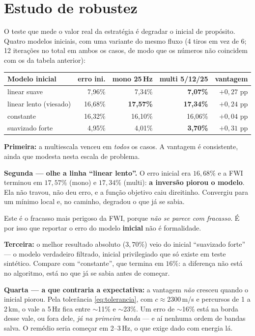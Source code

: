 \documentclass[11pt,a4paper,oneside]{report}
\begin{document}
\section{Estudo de robustez}

O teste que mede o valor real da estrat\'egia \'e degradar o inicial de
prop\'osito. Quatro modelos iniciais, com uma variante do mesmo fluxo (4 tiros
em vez de 6; 12 itera\c{c}\~oes no total em ambos os casos, de modo que os
n\'umeros n\~ao coincidem com os da tabela anterior):

\begin{center}
\begin{tabular}{@{}lrrrr@{}}
\toprule
\textbf{Modelo inicial} & \textbf{erro ini.} & \textbf{mono 25\,Hz}
& \textbf{multi 5/12/25} & \textbf{vantagem} \\
\midrule
linear suave           & 7{,}96\%  & 7{,}34\%  & \textbf{7{,}07\%}  & $+0{,}27$ pp \\
linear lento (viesado) & 16{,}68\% & \textbf{17{,}57\%} & \textbf{17{,}34\%} & $+0{,}24$ pp \\
constante              & 16{,}32\% & 16{,}10\% & 16{,}06\% & $+0{,}04$ pp \\
suavizado forte        & 4{,}95\%  & 4{,}01\%  & \textbf{3{,}70\%}  & $+0{,}31$ pp \\
\bottomrule
\end{tabular}
\end{center}

\begin{teoria}
\textbf{Primeira:} a multiescala venceu em \emph{todos} os casos. A vantagem
\'e consistente, ainda que modesta nesta escala de problema.

\textbf{Segunda --- olhe a linha ``linear lento''.} O erro inicial era
$16{,}68\%$ e a FWI terminou em $17{,}57\%$ (mono) e $17{,}34\%$ (multi):
\textbf{a invers\~ao piorou o modelo}. Ela n\~ao travou, n\~ao deu erro, e a
fun\c{c}\~ao objetivo caiu direitinho. Convergiu para um m\'inimo local e, no
caminho, degradou o que j\'a se sabia.

Este \'e o fracasso mais perigoso da FWI, porque \emph{n\~ao se parece com
fracasso}. \'E por isso que reportar o erro do modelo \textbf{inicial} n\~ao
\'e formalidade.

\textbf{Terceira:} o melhor resultado absoluto ($3{,}70\%$) veio do inicial
``suavizado forte'' --- o modelo verdadeiro filtrado, inicial privilegiado que
s\'o existe em teste sint\'etico. Compare com ``constante'', que termina em
$16\%$: a diferen\c{c}a n\~ao est\'a no algoritmo, est\'a no que j\'a se sabia
antes de come\c{c}ar.

\textbf{Quarta --- a que contraria a expectativa:} a vantagem \emph{n\~ao}
cresceu quando o inicial piorou. Pela toler\^ancia \eqref{eq:tolerancia}, com
$c \approx 2300$\,m/s e percursos de 1 a 2\,km, o vale a 5\,Hz fica entre
$\sim$11\% e $\sim$23\%. Um erro de $\sim$16\% est\'a na borda desse vale, ou
fora dele, \emph{j\'a na primeira banda} --- e a\'i nenhuma ordem de bandas
salva. O rem\'edio seria come\c{c}ar em 2--3\,Hz, o que exige dado com energia
l\'a.
\end{teoria}
\end{document}
